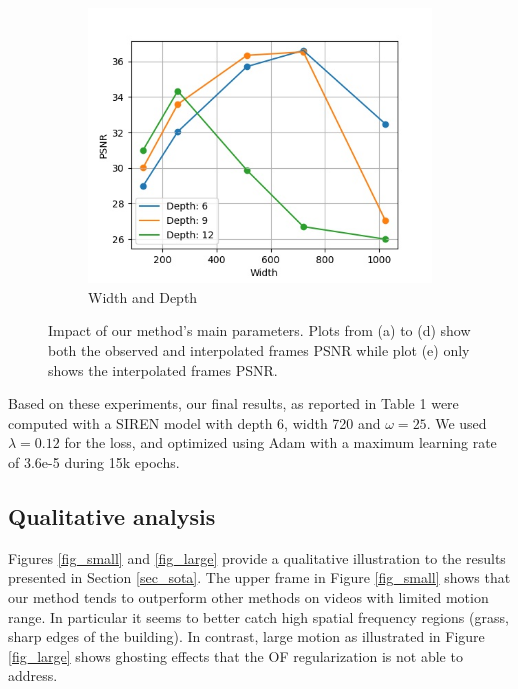 \documentclass{article}
\begin{document}
\begin{figure}[h]
\begin{subfigure}{0.3\textwidth}
\includegraphics[width=1\linewidth]{Width_Depth.jpg}
    \caption{Width and Depth}
\end{subfigure}
\caption{Impact of our method's main parameters. Plots from (a) to (d)
show both the observed and interpolated frames PSNR
while plot (e) only shows the interpolated frames PSNR.}
\label{fig_abl}
\end{figure}

Based on these experiments, our final results, as reported in Table 1 were computed with a SIREN model with depth 6, width 720 and $\omega=25$.
We used $\lambda = 0.12$ for the loss, and optimized using Adam with a maximum learning rate of 3.6e-5 during 15k epochs.


\subsection{Qualitative analysis}
\label{sec_qua}

Figures \ref{fig_small} and \ref{fig_large} provide a qualitative illustration to the results presented in Section \ref{sec_sota}.
The upper frame in Figure \ref{fig_small} shows that our method tends to outperform other methods on videos with limited motion range.
In particular it seems to better catch high spatial frequency regions (grass, sharp edges of the building).
In contrast, large motion as illustrated in Figure \ref{fig_large} shows ghosting effects that the OF regularization is not able to address.
\end{document}
